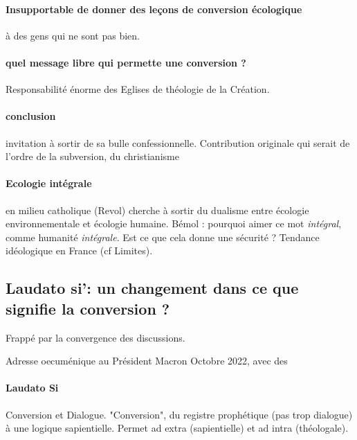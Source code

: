 \paragraph{Insupportable de donner des leçons de conversion écologique} à des gens qui ne sont pas bien.

\paragraph{quel message libre qui permette une conversion ? } Responsabilité énorme des Eglises de théologie de la Création. 

\paragraph{conclusion} invitation à sortir de sa bulle confessionnelle. Contribution originale qui serait de l'ordre de la subversion, du christianisme 

\paragraph{Ecologie intégrale} en milieu catholique (Revol) cherche à sortir du dualisme entre écologie environnementale et écologie humaine. 
Bémol : pourquoi aimer ce mot \textit{intégral}, comme humanité \textit{intégrale}. Est ce que cela donne une sécurité ? Tendance idéologique en France (cf Limites). 



\subsection{Laudato si’: un changement dans ce que signifie la conversion ?}

Frappé par la convergence des discussions. 

Adresse oecuménique au Président Macron Octobre 2022, avec des 

\paragraph{Laudato Si} Conversion et Dialogue. "Conversion", du registre prophétique (pas trop dialogue) à une logique sapientielle. Permet ad extra (sapientielle) et ad intra (théologale).

